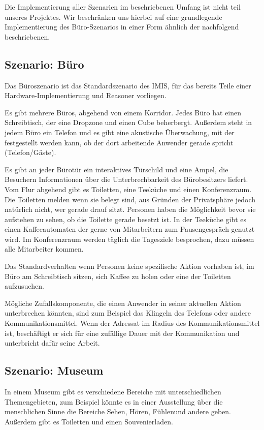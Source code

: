 Die Implementierung aller Szenarien im beschriebenen Umfang ist nicht teil unseres Projektes. Wir beschränken uns hierbei auf eine grundlegende Implementierung des Büro-Szenarios in einer Form ähnlich der nachfolgend beschriebenen. 

\subsection*{Szenario: Büro}

Das Büroszenario ist das Standardszenario des IMIS, für das bereits Teile einer Hardware-Implementierung und Reasoner vorliegen.

Es gibt mehrere Büros, abgehend von einem Korridor. Jedes Büro hat einen Schreibtisch, der eine Dropzone und einen Cube beherbergt. Außerdem steht in jedem Büro ein Telefon und es gibt eine akustische Überwachung, mit der festgestellt werden kann, ob der dort arbeitende Anwender gerade spricht (Telefon/Gäste). 

Es gibt an jeder Bürotür ein interaktives Türschild und eine Ampel, die Besuchern Informationen über die Unterbrechbarkeit des Bürobesitzers liefert.
Vom Flur abgehend gibt es Toiletten, eine Teeküche und einen Konferenzraum. Die Toiletten melden wenn sie belegt sind, aus Gründen der Privatsphäre jedoch natürlich nicht, wer gerade drauf sitzt.  Personen haben die Möglichkeit bevor sie aufstehen zu sehen, ob die Toilette gerade besetzt ist. In der Teeküche gibt es einen Kaffeeautomaten der gerne von Mitarbeitern zum Pausengespräch genutzt wird. Im Konferenzraum werden täglich die Tagesziele besprochen, dazu müssen alle Mitarbeiter kommen.

Das Standardverhalten wenn Personen keine spezifische Aktion vorhaben ist, im Büro am Schreibtisch sitzen, sich Kaffee zu holen oder eine der Toiletten aufzusuchen.

Mögliche Zufallskomponente, die einen Anwender in seiner aktuellen Aktion unterbrechen könnten, sind zum Beispiel das Klingeln des Telefons oder andere Kommunikationsmittel. Wenn der Adressat im Radius des Kommunikationsmittel ist, beschäftigt er sich für eine zufällige Dauer mit der Kommunikation und unterbricht dafür seine Arbeit.

\subsection*{Szenario: Museum}
 
In einem Museum gibt es verschiedene Bereiche mit unterschiedlichen Themengebieten, zum Beispiel könnte es in einer Ausstellung über die menschlichen Sinne die Bereiche \glqq Sehen\grqq , \glqq Hören\grqq, \glqq Fühlen\grqq und andere geben. Außerdem gibt es Toiletten und einen Souvenierladen.


